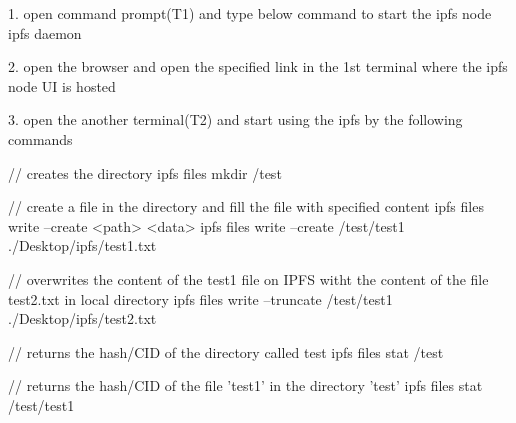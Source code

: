 1. open command prompt(T1) and type below command to start the ipfs node
ipfs daemon

2. open the browser and open the specified link in the 1st terminal where the ipfs node UI is hosted

3. open the another terminal(T2) and start using the ipfs by the following commands


// creates the directory
ipfs files mkdir /test

// create a file in the directory and fill the file with specified content
ipfs files write --create  <path> <data>   
ipfs files write --create /test/test1 ./Desktop/ipfs/test1.txt

// overwrites the content of the test1 file on IPFS witht the content of the file test2.txt in local directory
ipfs files write --truncate /test/test1 ./Desktop/ipfs/test2.txt

// returns the hash/CID of the directory called test
ipfs files stat /test

// returns the hash/CID of the file 'test1' in the directory 'test'
ipfs files stat /test/test1